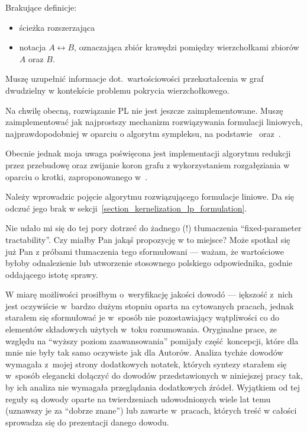 \begin{note}
  Brakujące definicje:
  \begin{itemize}
    \item ścieżka rozszerzająca
    \item notacja $A \leftrightarrow B$, oznaczająca zbiór krawędzi pomiędzy
      wierzchołkami zbiorów $A$ oraz $B$.
  \end{itemize}
\end{note}
\begin{note}
  Muszę uzupełnić informacje dot.\ wartościowości przekształcenia w graf
  dwudzielny w kontekście problemu pokrycia wierzchołkowego.
\end{note}
\begin{note}
  Na chwilę obecną, rozwiązanie PL nie jest jeszcze zaimplementowane.
  Muszę zaimplementować jak najprostszy mechanizm rozwiązywania formulacji
  liniowych, najprawdopodobniej w oparciu o algorytm sympleksu, na
  podstawie~\cite{sedgewick11} oraz~\cite{Cormen:2001:IA:580470}.


  Obecnie jednak moja uwaga poświęcona jest implementacji algorytmu redukcji 
  przez przebudowę oraz zwijanie koron grafu z wykorzystaniem rozgałęziania w
  oparciu o krotki, zaproponowanego w~\cite{ImprovedBounds10}. 
\end{note}
\begin{note}
  Należy wprowadzic pojęcie algorytmu rozwiązującego formulacje liniowe. 
  Da się odczuć jego brak w sekcji~\ref{section_kernelization_lp_formulation}.
\end{note}
\begin{note}
  Nie udało mi się do tej pory dotrzeć do żadnego (!) tłumaczenia
  ``fixed-parameter tractability''.
  Czy miałby Pan jakąś propozycję w to miejsce?
  Może spotkał się już Pan z próbami tłumaczenia tego sformułowani --- ważam, że
  wartościowe byłoby odnalezienie lub utworzenie stosownego polskiego
  odpowiednika, godnie oddającego istotę sprawy. 
\end{note}
\begin{note}
  W miarę możliwości prosiłbym o~weryfikację jakości dowodó --- iększość z~nich
  jest oczywiście w~bardzo dużym stopniu oparta na cytowanych pracach, jednak
  starałem się sformułować je w~sposób nie pozostawiający wątpliwości co do
  elementów składowych użytych w~toku rozumowania.
  Oryginalne prace, ze względu na ``wyższy poziom zaawansowania'' pomijały
  część~koncepcji, które dla mnie nie były tak samo oczywiste jak dla Autorów.
  Analiza tychże dowodów wymagała z~mojej strony dodatkowych notatek, których
  syntezy starałem się w~sposób elegancki dołączyć do dowodów przedstawionych w
  niniejszej pracy tak, by ich analiza nie wymagała przeglądania dodatkowych
  źródeł.
  Wyjątkiem od tej reguły są dowody oparte na twierdzeniach udowodnionych wiele
  lat temu (uznawszy je za ``dobrze znane'') lub zawarte w~pracach, których 
  treść w całości sprowadza się do prezentacji danego dowodu.
\end{note}
